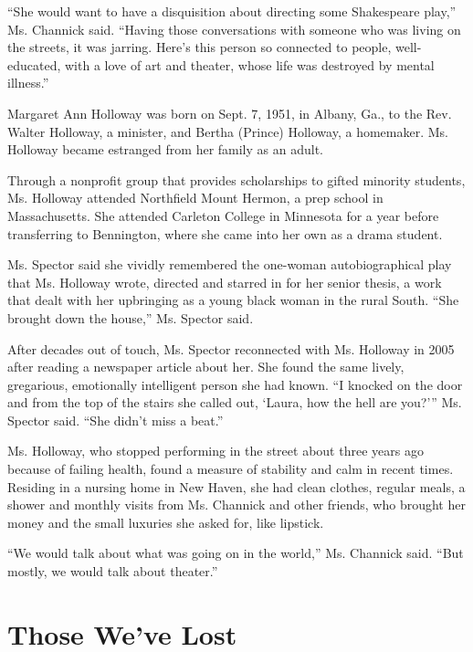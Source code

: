 ``She would want to have a disquisition about directing some Shakespeare
play,'' Ms. Channick said. ``Having those conversations with someone who
was living on the streets, it was jarring. Here's this person so
connected to people, well-educated, with a love of art and theater,
whose life was destroyed by mental illness.''

Margaret Ann Holloway was born on Sept. 7, 1951, in Albany, Ga., to the
Rev. Walter Holloway, a minister, and Bertha (Prince) Holloway, a
homemaker. Ms. Holloway became estranged from her family as an adult.

Through a nonprofit group that provides scholarships to gifted minority
students, Ms. Holloway attended Northfield Mount Hermon, a prep school
in Massachusetts. She attended Carleton College in Minnesota for a year
before transferring to Bennington, where she came into her own as a
drama student.

Ms. Spector said she vividly remembered the one-woman autobiographical
play that Ms. Holloway wrote, directed and starred in for her senior
thesis, a work that dealt with her upbringing as a young black woman in
the rural South. ``She brought down the house,'' Ms. Spector said.

After decades out of touch, Ms. Spector reconnected with Ms. Holloway in
2005 after reading a newspaper article about her. She found the same
lively, gregarious, emotionally intelligent person she had known. ``I
knocked on the door and from the top of the stairs she called out,
`Laura, how the hell are you?''' Ms. Spector said. ``She didn't miss a
beat.''

Ms. Holloway, who stopped performing in the street about three years ago
because of failing health, found a measure of stability and calm in
recent times. Residing in a nursing home in New Haven, she had clean
clothes, regular meals, a shower and monthly visits from Ms. Channick
and other friends, who brought her money and the small luxuries she
asked for, like lipstick.

``We would talk about what was going on in the world,'' Ms. Channick
said. ``But mostly, we would talk about theater.''

\href{https://www.nytimes3xbfgragh.onion/interactive/2020/obituaries/people-died-coronavirus-obituaries.html?action=click\&pgtype=Article\&state=default\&region=BELOW_MAIN_CONTENT\&context=covid_obits_promo}{}

\hypertarget{those-weve-lost}{%
\section{Those We've Lost}\label{those-weve-lost}}

